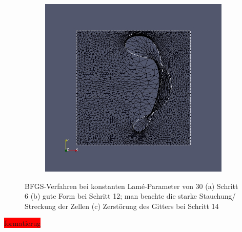 \begin{figure}
\begin{subfigure}{0.3\textwidth}
	\caption{}	
	\end{subfigure}
	\begin{subfigure}{0.3\textwidth}
	\centering
	\includegraphics[scale=0.2]{pic_brokendonut_bfgs_konstlame_14.jpg}
	\caption{}	
	\end{subfigure}
\caption{BFGS-Verfahren bei konstanten Lamé-Parameter von 30 (a) Schritt 6 (b) gute Form bei Schritt 12; man beachte die starke Stauchung/ Streckung der Zellen (c) Zerstörung des Gitters bei Schritt 14}
\label{brokendonut_bfgs_konstlame}
\end{figure}

\colorbox{red}{formatierug}

